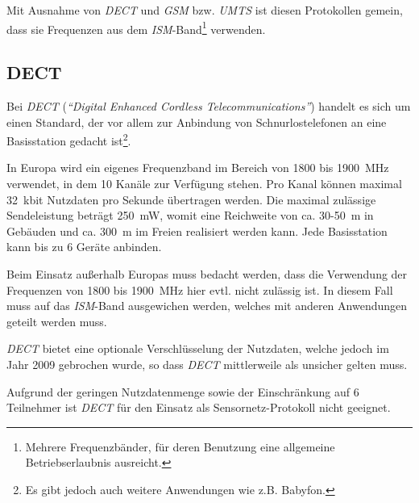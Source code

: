         Mit Ausnahme von \emph{DECT} und \emph{GSM} bzw. \emph{UMTS} ist diesen Protokollen gemein, dass 
        sie Frequenzen aus dem \emph{ISM}-Band\footnote{Mehrere Frequenzbänder, für deren Benutzung eine allgemeine 
            Betriebserlaubnis ausreicht.} verwenden. 

    \subsection{DECT}

        Bei \emph{DECT} (\emph{"`Digital Enhanced Cordless Telecommunications"'}) handelt es sich um einen Standard, 
        der vor allem zur Anbindung von Schnurlostelefonen an eine Basisstation gedacht ist\footnote{Es gibt
        jedoch auch weitere Anwendungen wie z.B. Babyfon.}. 

        In Europa wird ein eigenes Frequenzband im Bereich von 1800 bis 1900~MHz verwendet, in dem 10 
        Kanäle zur Verfügung stehen. Pro Kanal können maximal 32~kbit Nutzdaten pro Sekunde übertragen
        werden. Die maximal zulässige Sendeleistung beträgt 250~mW, womit eine Reichweite von ca. 30-50~m 
        in Gebäuden und ca. 300~m im Freien realisiert werden kann. Jede Basisstation kann
        bis zu 6 Geräte anbinden.

        Beim Einsatz außerhalb Europas muss bedacht werden, dass die Verwendung der Frequenzen von
        1800 bis 1900~MHz hier evtl. nicht zulässig ist. In diesem Fall muss auf das \emph{ISM}-Band 
        ausgewichen werden, welches  mit anderen Anwendungen geteilt werden muss.
        \cite{etsi_dect}

        \emph{DECT} bietet eine optionale Verschlüsselung der Nutzdaten, welche jedoch im Jahr 2009 gebrochen 
        wurde, so dass \emph{DECT} mittlerweile als unsicher gelten muss. \cite{dedected}

        Aufgrund der geringen Nutzdatenmenge sowie der Einschränkung auf 6 Teilnehmer ist
        \emph{DECT} für den Einsatz als Sensornetz-Protokoll nicht geeignet.

